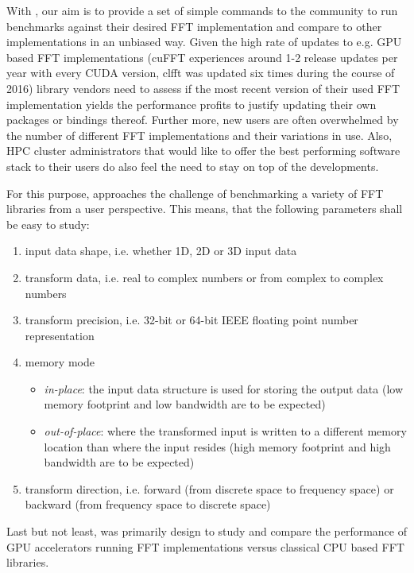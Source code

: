 With \gearshifft{}, our aim is to provide a set of simple commands to the community to run benchmarks against their desired FFT implementation and compare to other implementations in an unbiased way. Given the high rate of updates to e.g. GPU based FFT implementations (cuFFT experiences around 1-2 release updates per year with every CUDA version, clfft was updated six times during the course of 2016) library vendors need to assess if the most recent version of their used FFT implementation yields the performance profits to justify updating their own packages or bindings thereof. Further more, new users are often overwhelmed by the number of different FFT implementations and their variations in use. Also, HPC cluster administrators that would like to offer the best performing software stack to their users do also feel the need to stay on top of the developments. 

For this purpose, \gearshifft{} approaches the challenge of benchmarking a variety of FFT libraries from a user perspective. This means, that the following parameters shall be easy to study:

\begin{enumerate}
\item input data shape, i.e. whether 1D, 2D or 3D input data
\item transform data, i.e. real to complex numbers or from complex to complex numbers
\item transform precision, i.e. 32-bit or 64-bit IEEE floating point number representation
\item memory mode
  \begin{itemize}
  \item \emph{in-place}: the input data structure is used for storing the output data (low memory footprint and low bandwidth are to be expected)
  \item \emph{out-of-place}:  where the transformed input is written to a different memory location than where the input resides (high memory footprint and high bandwidth are to be expected)
  \end{itemize}
\item transform direction, i.e. forward (from discrete space to frequency space) or backward (from frequency space to discrete space)
\end{enumerate}
 
Last but not least, \gearshifft{} was primarily design to study and compare the performance of GPU accelerators running FFT implementations versus classical CPU based FFT libraries.   
